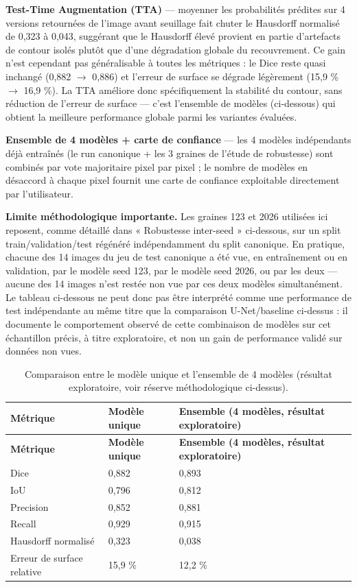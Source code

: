 \documentclass[12pt,a4paper]{report}
\begin{document}
\textbf{Test-Time Augmentation (TTA)} --- moyenner les probabilités prédites sur 4 versions retournées de l'image avant seuillage fait chuter le Hausdorff normalisé de 0,323 à 0,043, suggérant que le Hausdorff élevé provient en partie d'artefacts de contour isolés plutôt que d'une dégradation globale du recouvrement. Ce gain n'est cependant pas généralisable à toutes les métriques : le Dice reste quasi inchangé (0,882 $\to$ 0,886) et l'erreur de surface se dégrade légèrement (15,9 \% $\to$ 16,9 \%). La TTA améliore donc spécifiquement la stabilité du contour, sans réduction de l'erreur de surface --- c'est l'ensemble de modèles (ci-dessous) qui obtient la meilleure performance globale parmi les variantes évaluées.

\textbf{Ensemble de 4 modèles + carte de confiance} --- les 4 modèles indépendants déjà entraînés (le run canonique + les 3 graines de l'étude de robustesse) sont combinés par vote majoritaire pixel par pixel ; le nombre de modèles en désaccord à chaque pixel fournit une carte de confiance exploitable directement par l'utilisateur.

\textbf{Limite méthodologique importante.} Les graines 123 et 2026 utilisées ici reposent, comme détaillé dans « Robustesse inter-seed » ci-dessous, sur un split train/validation/test régénéré indépendamment du split canonique. En pratique, chacune des 14 images du jeu de test canonique a été vue, en entraînement ou en validation, par le modèle seed 123, par le modèle seed 2026, ou par les deux --- aucune des 14 images n'est restée non vue par ces deux modèles simultanément. Le tableau ci-dessous ne peut donc pas être interprété comme une performance de test indépendante au même titre que la comparaison U-Net/baseline ci-dessus : il documente le comportement observé de cette combinaison de modèles sur cet échantillon précis, à titre exploratoire, et non un gain de performance validé sur données non vues.

\begin{longtable}{L{5cm} R{3cm} R{5cm}}
\caption{Comparaison entre le modèle unique et l'ensemble de 4 modèles (résultat exploratoire, voir réserve méthodologique ci-dessus).}
\label{tab:ensemble} \\
\toprule
\textbf{Métrique} & \textbf{Modèle unique} & \textbf{Ensemble (4 modèles, résultat exploratoire)} \\
\midrule
\endfirsthead
\toprule
\textbf{Métrique} & \textbf{Modèle unique} & \textbf{Ensemble (4 modèles, résultat exploratoire)} \\
\midrule
\endhead
Dice & 0,882 & 0,893 \\
IoU & 0,796 & 0,812 \\
Precision & 0,852 & 0,881 \\
Recall & 0,929 & 0,915 \\
Hausdorff normalisé & 0,323 & 0,038 \\
Erreur de surface relative & 15,9 \% & 12,2 \% \\
\bottomrule
\end{longtable}
\end{document}
